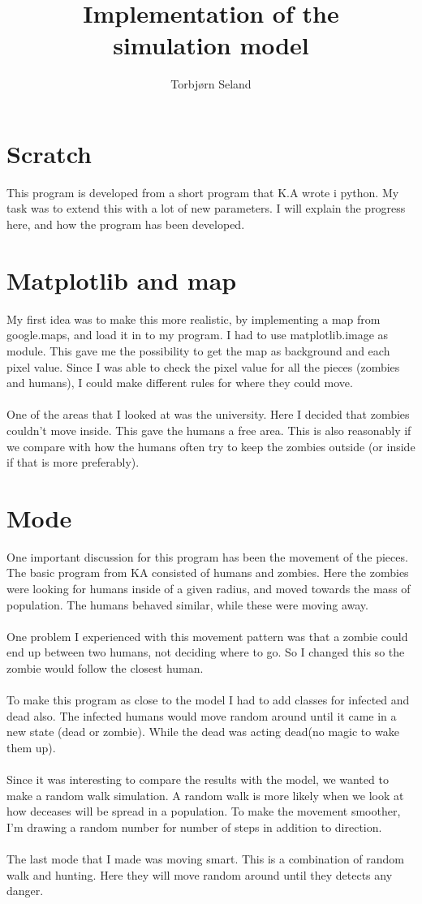 \documentclass[11pt]{article}
\title{\textbf{Implementation of the\\simulation model}}
\author{Torbjørn Seland}
\date{}
\begin{document}
\maketitle

\section*{Scratch}
This program is developed from a short program that K.A wrote i python. My task was to
extend this with a lot of new parameters. I will explain the progress here, and how the program has been 
developed.

\section*{Matplotlib and map}
My first idea was to make this more realistic, by implementing a map from google.maps, and load it in
to my program. I had to use matplotlib.image as module. This gave me the possibility to get the map as background and each pixel value. Since I was able to check the pixel value for all the pieces (zombies and humans), I could make different rules for where they could move. 
\\
\\
One of the areas that I looked at was the university. Here I decided that zombies couldn’t move inside. This gave the humans a free area. This is also reasonably if we compare with how the humans often try to keep the zombies outside (or inside if that is more preferably). 

\section*{Mode}
One important discussion for this program has been the movement of the pieces. The basic program from KA consisted of humans and zombies. Here the zombies were looking for humans inside of a given radius, and moved towards the mass of population. The humans behaved similar, while these were moving away.
\\
\\
One problem I experienced with this movement pattern was that a zombie could end up between two humans, not deciding where to go. So I changed this so the zombie would follow the closest human. 
\\
\\
To make this program as close to the model I had to add classes for infected and dead also. The infected humans would move random around until it came in a new state (dead or zombie). While the dead was acting dead(no magic to wake them up). 
\\
\\
Since it was interesting to compare the results with the model, we wanted to make a random walk simulation. A random walk is more likely when we look at how deceases will be spread in a population. To make the movement smoother, I’m drawing a random number for number of steps in addition to direction. 
\\
\\
The last mode that I made was moving smart. This is a combination of random walk and hunting. Here they will move random around until they detects any danger. 
\end{document}
